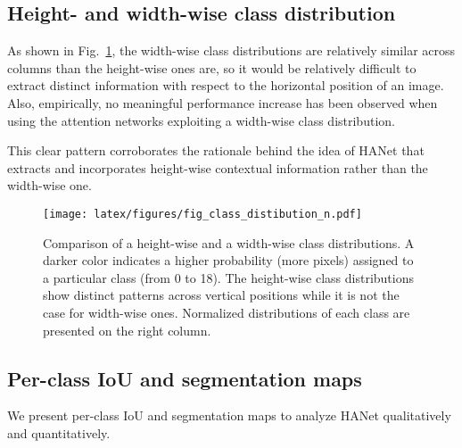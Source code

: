 \documentclass[10pt,twocolumn,letterpaper]{article}
\begin{document}
\subsection{Height- and width-wise class distribution} \label{app:height_wdith}
\vspace*{-0.1cm}
As shown in Fig.~\ref{fig:row_vs_col}, the width-wise class distributions are relatively similar across columns than the height-wise ones are, so it would be relatively difficult to extract distinct information with respect to the horizontal position of an image. 
Also, empirically, no meaningful performance increase has been observed when using the attention networks exploiting a width-wise class distribution.

This clear pattern corroborates the rationale behind the idea of HANet that extracts and incorporates height-wise contextual information rather than the width-wise one.











\begin{figure}[!t]
\centering
  \texttt{[image: latex/figures/fig\_class\_distibution\_n.pdf]}
  \caption{Comparison of a height-wise and a width-wise class distributions. A darker color indicates a higher probability (more pixels) assigned to a particular class (from 0 to 18). The height-wise class distributions show distinct patterns across vertical positions while it is not the case for width-wise ones. Normalized distributions of each class are presented on the right column.
}
\label{fig:row_vs_col}
\vspace*{-0.3cm}
\end{figure}

\subsection{Per-class IoU and segmentation maps} \label{app:segmentation_maps}
\vspace*{-0.1cm}
We present per-class IoU and segmentation maps to analyze HANet qualitatively and quantitatively. 
\vspace*{-0.4cm}
\end{document}
